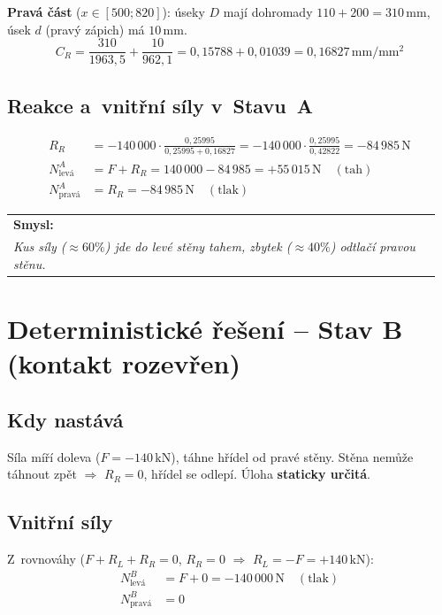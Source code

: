 \documentclass[a4paper,11pt]{article}
\makeatletter
\newcommand{\unit}[1]{\,\mathrm{#1}}
\newenvironment{poznamka}[1][Poznámka]{%
    \par\medskip\noindent\begin{tabular}{@{}|p{0.96\linewidth}@{}}\hline
    \textbf{#1:}\\[-0.4ex]\itshape\ignorespaces}{%
    \\\hline\end{tabular}\par\medskip}
\makeatother
\begin{document}
\textbf{Pravá část} ($x \in [500; 820]$): úseky $D$ mají dohromady $110 + 200 = 310\unit{mm}$, úsek $d$ (pravý zápich) má $10\unit{mm}$.
\begin{equation}
C_R = \frac{310}{1963{,}5} + \frac{10}{962{,}1} = 0{,}15788 + 0{,}01039 = 0{,}16827\unit{mm/mm^2}
\end{equation}

\subsection{Reakce a~vnitřní síly v~Stavu~A}

\begin{align}
R_R &= -140\,000 \cdot \frac{0{,}25995}{0{,}25995 + 0{,}16827} = -140\,000 \cdot \frac{0{,}25995}{0{,}42822} = \boxed{-84\,985\unit{N}} \\[1ex]
N_{\mathrm{levá}}^{A} &= F + R_R = 140\,000 - 84\,985 = \boxed{+55\,015\unit{N}}\quad (\text{tah}) \\[1ex]
N_{\mathrm{pravá}}^{A} &= R_R = \boxed{-84\,985\unit{N}}\quad (\text{tlak})
\end{align}

\begin{poznamka}[Smysl]
Kus síly ($\approx 60\%$) jde do levé stěny tahem, zbytek ($\approx 40\%$) odtlačí pravou stěnu.
\end{poznamka}

\section{Deterministické řešení -- Stav B (kontakt rozevřen)}

\subsection{Kdy nastává}

Síla míří doleva ($F = -140\unit{kN}$), táhne hřídel od pravé stěny. Stěna nemůže táhnout zpět $\Rightarrow$ $R_R = 0$, hřídel se odlepí. Úloha \textbf{staticky určitá}.

\subsection{Vnitřní síly}

Z~rovnováhy ($F + R_L + R_R = 0$, $R_R = 0$ $\Rightarrow$ $R_L = -F = +140\unit{kN}$):
\begin{align}
N_{\mathrm{levá}}^{B} &= F + 0 = \boxed{-140\,000\unit{N}}\quad (\text{tlak}) \\
N_{\mathrm{pravá}}^{B} &= 0
\end{align}
\end{document}

